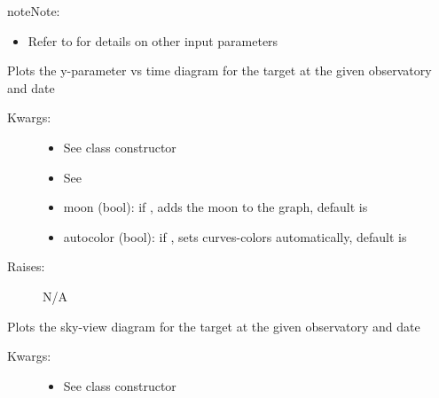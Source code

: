 \documentclass[letterpaper,10pt,english]{sphinxmanual}
\begin{document}
\begin{fulllineitems}
\begin{fulllineitems}
\begin{description}
\end{description}

\begin{notice}{note}{Note:}\begin{itemize}
\item {} 
Refer to  for details on other input parameters

\end{itemize}
\end{notice}

\end{fulllineitems}


\begin{fulllineitems}
\label{astroobs:astroobs.Observation.Observation.plot}
Plots the y-parameter vs time diagram for the target at the given observatory and date
\begin{description}
\item[{Kwargs:}] \leavevmode\begin{itemize}
\item {} 
See class constructor

\item {} 
See 

\item {} 
moon (bool): if , adds the moon to the graph, default is 

\item {} 
autocolor (bool): if , sets curves-colors automatically, default is 

\end{itemize}

\item[{Raises:}] \leavevmode
N/A

\end{description}

\end{fulllineitems}


\begin{fulllineitems}
\label{astroobs:astroobs.Observation.Observation.polar}
Plots the sky-view diagram for the target at the given observatory and date
\begin{description}
\item[{Kwargs:}] \leavevmode\begin{itemize}
\item {} 
See class constructor


\end{itemize}
\end{description}
\end{fulllineitems}
\end{fulllineitems}
\end{document}
